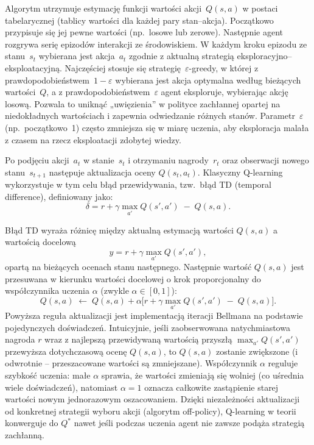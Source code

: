 \documentclass[a4paper,12pt]{article}
\begin{document}
Algorytm utrzymuje estymację funkcji wartości akcji~$Q(s,a)$ w postaci tabelarycznej (tablicy wartości dla każdej pary stan–akcja). Początkowo przypisuje się jej pewne wartości (np.\ losowe lub zerowe). Następnie agent rozgrywa serię epizodów interakcji ze środowiskiem. W każdym kroku epizodu ze stanu~$s_t$ wybierana jest akcja~$a_t$ zgodnie z aktualną strategią eksploracyjno–eksploatacyjną. Najczęściej stosuje się strategię~$\varepsilon$-greedy, w której z prawdopodobieństwem~$1-\varepsilon$ wybierana jest akcja optymalna według bieżących wartości~$Q$, a z prawdopodobieństwem~$\varepsilon$ agent eksploruje, wybierając akcję losową. Pozwala to uniknąć „uwięzienia” w polityce zachłannej opartej na niedokładnych wartościach i zapewnia odwiedzanie różnych stanów. Parametr~$\varepsilon$ (np.\ początkowo~1) często zmniejsza się w miarę uczenia, aby eksploracja malała z czasem na rzecz eksploatacji zdobytej wiedzy.

Po podjęciu akcji~$a_t$ w stanie~$s_t$ i otrzymaniu nagrody~$r_t$ oraz obserwacji nowego stanu~$s_{t+1}$ następuje aktualizacja oceny $Q(s_t,a_t)$. Klasyczny Q-learning wykorzystuje w tym celu błąd przewidywania, tzw.\ błąd TD (temporal difference), definiowany jako:
\begin{equation}
\delta = r + \gamma \max_{a'} Q(s',a') \;-\; Q(s,a).
\end{equation}

Błąd TD wyraża różnicę między aktualną estymacją wartości \(Q(s,a)\) a wartością docelową
\begin{equation}
y = r + \gamma \max_{a'} Q(s',a'),
\end{equation}
opartą na bieżących ocenach stanu następnego. Następnie wartość \(Q(s,a)\) jest przesuwana w kierunku wartości docelowej o krok proporcjonalny do współczynnika uczenia \(\alpha\) (zwykle \(\alpha \in [0,1]\)):
\begin{equation}
Q(s,a) \;\leftarrow\; Q(s,a) + \alpha\bigl[r + \gamma \max_{a'} Q(s',a') \;-\; Q(s,a)\bigr].
\end{equation}
Powyższa reguła aktualizacji jest implementacją iteracji Bellmana na podstawie pojedynczych doświadczeń. Intuicyjnie, jeśli zaobserwowana natychmiastowa nagroda \(r\) wraz z najlepszą przewidywaną wartością przyszłą \(\max_{a'} Q(s',a')\) przewyższa dotychczasową ocenę \(Q(s,a)\), to \(Q(s,a)\) zostanie zwiększone (i odwrotnie – przeszacowane wartości są zmniejszane). Współczynnik \(\alpha\) reguluje szybkość uczenia: małe \(\alpha\) sprawia, że wartości zmieniają się wolniej (co uśrednia wiele doświadczeń), natomiast \(\alpha = 1\) oznacza całkowite zastąpienie starej wartości nowym jednorazowym oszacowaniem. Dzięki niezależności aktualizacji od konkretnej strategii wyboru akcji (algorytm off-policy), Q-learning w teorii konwerguje do \(Q^*\) nawet jeśli podczas uczenia agent nie zawsze podąża strategią zachłanną.
\end{document}
